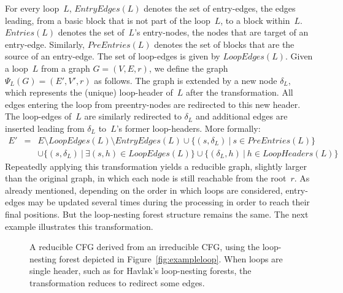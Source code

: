For every loop~$L$, $\textit{EntryEdges}(L)$ denotes the set of entry-edges, \ie the edges leading, from a basic block that is not part of the loop~$L$, to a block within~$L$.
$\textit{Entries}(L)$ denotes the set of~$L$'s entry-nodes, \ie the nodes that are target of an entry-edge.
Similarly, $\textit{PreEntries}(L)$ denotes the set of blocks that are the source of an entry-edge.
The set of loop-edges is given by $\textit{LoopEdges}(L)$.
Given a loop~$L$ from a graph $G = (V, E, r)$, we define the graph $\Psi_L (G) = (E', V', r)$ as follows.
The graph is extended by a new node $\delta_L$, which represents the (unique) loop-header of~$L$ after the transformation.
All edges entering the loop from preentry-nodes are redirected to this new header.
The loop-edges of~$L$ are similarly redirected to $\delta_L$ and additional edges are inserted leading from $\delta_L$ to~$L$'s former loop-headers.
More formally:
%
\begin{eqnarray*}
  E' & = & E \setminus \textit{LoopEdges}(L) \setminus \textit{EntryEdges}(L)
\cup \{ (s, \delta_L)~|~s \in \textit{PreEntries}(L) \} \\
     &   & \cup \{ (s, \delta_L)~|~\exists (s, h) \in \textit{LoopEdges}(L) \}
\cup \{ (\delta_L, h)~|~h  \in \textit{LoopHeaders}(L) \}
\end{eqnarray*}
%
Repeatedly applying this transformation yields a reducible graph, slightly larger than the original graph, in which each node is still reachable from the root~$r$.
As already mentioned, depending on the order in which loops are considered, entry-edges may be updated several times during the processing in order to reach their final positions.
But the loop-nesting forest structure remains the same.
The next example illustrates this transformation.

\begin{figure}[t]
  \begin{center}
    \hspace{4mm}
    \hspace{4mm}
  \end{center}
  \caption{%
	  A reducible CFG derived from an irreducible CFG, using the loop-nesting forest depicted in Figure~\ref{fig:exampleloop}.
	  When loops are single header, such as for Havlak's loop-nesting forests, the transformation reduces to redirect some edges.}
  \label{fig:examplecfg}
\end{figure}


